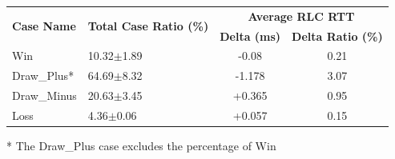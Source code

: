 \begin{table}
\small
\begin{tabularx}{0.50\textwidth}{ | l | X | c | c |}
	\hline
	\multirow{2}{*}{\textbf{Case Name}} & \multirow{2}{*}{\textbf{Total Case Ratio (\%)}} & \multicolumn{2}{|c|}{\textbf{Average RLC RTT}} \\ \cline{3-4}
	& & \textbf{Delta (ms)} & \textbf{Delta Ratio (\%)} \\ 
	\hline\hline
  	Win & 10.32$\pm$1.89 & -0.08 & 0.21 \\
  	\hline
  	Draw\_{Plus}* & 64.69$\pm$8.32 & -1.178 & 3.07 \\
  	\hline
  	Draw\_{Minus} & 20.63$\pm$3.45 & +0.365 & 0.95 \\
  	\hline
  	Loss & 4.36$\pm$0.06 & +0.057 & 0.15 \\
  	\hline
\end{tabularx}
* The Draw\_{Plus} case excludes the percentage of Win
\label{tab:rlc.fast.sim}
\end{table}
